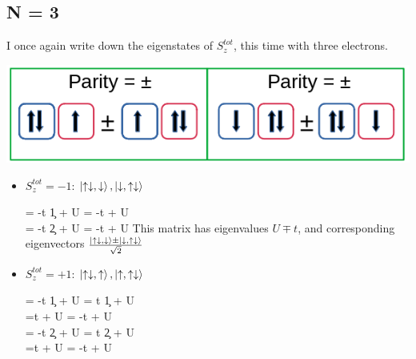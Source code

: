 \documentclass[12pt]{article}
\begin{document}
\subsection{N = 3}
I once again write down the eigenstates of \(S_z^{tot}\), this time with three electrons.
\begin{center}
	\includegraphics[scale=0.5]{four.png}
\end{center}
\begin{itemize}
\item \(S_z^{tot} = -1\): \(\ket{\uparrow\downarrow,\downarrow}, \ket{\downarrow,\uparrow\downarrow}\)

\beq
\ham \ket{\uparrow\downarrow,\downarrow} = -t \c{1}{\uparrow}\ket{\uparrow\downarrow,\downarrow} + U\ket{\uparrow\downarrow,\downarrow} = -t\ket{\downarrow,\uparrow\downarrow} + U\ket{\uparrow\downarrow,\downarrow} \\
\ham \ket{\downarrow,\uparrow\downarrow} = -t \c{2}{\uparrow}\ket{\downarrow,\uparrow\downarrow} + U\ket{\downarrow,\uparrow\downarrow} = -t\ket{\uparrow\downarrow,\downarrow} + U\ket{\downarrow,\uparrow\downarrow}
\eeq
\beq
{}
\eeq
This matrix has eigenvalues \(U \mp t\), and corresponding eigenvectors \(\frac{\ket{\uparrow\downarrow,\downarrow} \pm \ket{\downarrow,\uparrow\downarrow}}{\sqrt{2}}\)

\item \(S_z^{tot} = +1\): \(\ket{\uparrow\downarrow,\uparrow}, \ket{\uparrow,\uparrow\downarrow}\)

\beq
\ham \ket{\uparrow\downarrow,\uparrow} = -t \c{1}{\downarrow}\ket{\uparrow\downarrow,\uparrow} + U\ket{\uparrow\downarrow,\uparrow} = t \c{1}{\downarrow}\ket{\downarrow\uparrow,\uparrow} + U\ket{\uparrow\downarrow,\uparrow} \\
=t \ket{\uparrow,\downarrow\uparrow} + U\ket{\uparrow\downarrow,\uparrow} = -t \ket{\uparrow,\uparrow\downarrow} + U\ket{\uparrow\downarrow,\uparrow}\\
\ham \ket{\uparrow,\uparrow\downarrow} = -t \c{2}{\downarrow}\ket{\uparrow,\uparrow\downarrow} + U\ket{\uparrow,\uparrow\downarrow} = t \c{2}{\downarrow}\ket{\uparrow,\downarrow\uparrow} + U\ket{\uparrow,\uparrow\downarrow} \\
=t \ket{\downarrow\uparrow,\uparrow} + U\ket{\uparrow,\uparrow\downarrow} = -t \ket{\uparrow\downarrow,\uparrow} + U\ket{\uparrow,\uparrow\downarrow}\\
\eeq


\end{itemize}
\end{document}
